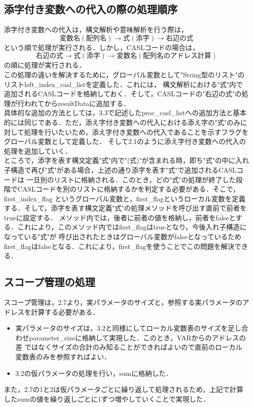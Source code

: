 \documentclass[dvipdfmx]{jarticle}
\begin{document}
\subsection{添字付き変数への代入の際の処理順序}
添字付き変数への代入は，構文解析や意味解析を行う際は，
\[変数名(配列名)→式(添字)→右辺の式\]
という順で処理が実行される．しかし，CASLコードの場合は，
\[右辺の式→式(添字)→変数名(配列名のアドレス計算)\]
の順に処理が実行される．\\
この処理の違いを解決するために，グローバル変数として"String型のリスト"のリストleft\_index\_casl\_listを定義した．これには，
構文解析における"式"内で追加されるCASLコードを格納しておく．そして，CASLコードの"右辺の式"の処理が行われてからresultDataに追加する．\\
具体的な追加の方法としては，3.3で記述したproc\_casl\_listへの追加方法と基本的には同じである．ただ，添え字付き変数への代入における添え字の"式"のみに
対して処理を行いたいため，添え字付き変数への代入であることを示すフラグをグローバル変数として定義した．
そして2.1のように添え字付き変数への代入の処理を追加していく．
\\
ところで，添字を表す構文定義"式"内で"(式)"が含まれる時，即ち"式"の中に入れ子構造で再び"式"がある場合，上述の通り添字を表す"式"で追加されるCASLコードは
一旦別のリストに格納される．このとき，どの"式"の処理が終了した段階でCASLコードを別のリストに格納するかを判定する必要がある．そこで，first\_index\_flag
というグローバル変数と，first\_flagというローカル変数を定義する．そして，添字を表す構文定義"式"の処理メソッドを呼び出す直前で前者をtrueに設定する．
メソッド内では，後者に前者の値を格納し，前者をfalseとする．これにより，このメソッド内ではfirst\_flagはtrueとなり，今後入れ子構造になっている"式"が
呼び出されたときはグローバル変数がfalseとなっているためfirst\_flagはfalseとなる．これにより，first\_flagを使うことでこの問題を解決できる．
\subsection{スコープ管理の処理}
スコープ管理は，2.7より，実パラメータのサイズと，参照する実パラメータのアドレスを計算する必要がある．
\begin{itemize}
  \item 実パラメータのサイズは，3.2と同様にしてローカル変数表のサイズを足し合わせparameter\_sizeに格納して実現した．このとき，VARからのアドレスの差
  ではなくサイズの合計のみ知ることができればよいので直前のローカル変数表のみを参照すればよい．
  \item 3.2の仮パラメータの処理を行い，sumに格納した．
\end{itemize}
また，2.7の1と2は仮パラメータごとに繰り返して処理されるため，上記で計算したsumの値を繰り返しごとに1ずつ増やしていくことで実現した．
\end{document}
